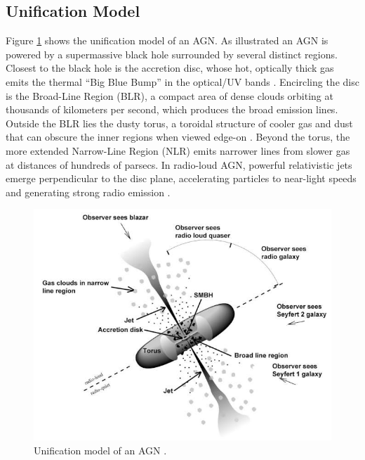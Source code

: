 \subsection{Unification Model}
\label{sec:unification_model}
Figure \ref{fig:agn_sed} shows the unification model of an AGN. 
As illustrated an AGN is powered by a supermassive black hole surrounded by several distinct regions. Closest to the black hole is the accretion disc, whose hot, optically thick gas emits the thermal “Big Blue Bump” in the optical/UV bands \parencite{peterson1997introduction}. Encircling the disc is the Broad-Line Region (BLR), a compact area of dense clouds orbiting at thousands of kilometers per second, which produces the broad emission lines. Outside the BLR lies the dusty torus, a toroidal structure of cooler gas and dust that can obscure the inner regions when viewed edge-on \parencite{antonucci1993unified}. Beyond the torus, the more extended Narrow-Line Region (NLR) emits narrower lines from slower gas at distances of hundreds of parsecs. In radio-loud AGN, powerful relativistic jets emerge perpendicular to the disc plane, accelerating particles to near-light speeds and generating strong radio emission \parencite{urry1995unified}.


\begin{figure}[!ht]
	\centering
	\includegraphics[width=\textwidth]{pictures/Chapter2/AGN_unified_model.jpg}
	\caption{Unification model of an AGN \parencite{fermi2025figure1}.}
	\label{fig:agn_sed}
\end{figure}



